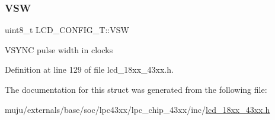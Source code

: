 \subsubsection{\texorpdfstring{V\+SW}{VSW}}
{\footnotesize\ttfamily uint8\+\_\+t L\+C\+D\+\_\+\+C\+O\+N\+F\+I\+G\+\_\+\+T\+::\+V\+SW}

V\+S\+Y\+NC pulse width in clocks 

Definition at line 129 of file lcd\+\_\+18xx\+\_\+43xx.\+h.



The documentation for this struct was generated from the following file\+:\begin{DoxyCompactItemize}
\item 
muju/externals/base/soc/lpc43xx/lpc\+\_\+chip\+\_\+43xx/inc/\hyperlink{lcd__18xx__43xx_8h}{lcd\+\_\+18xx\+\_\+43xx.\+h}\end{DoxyCompactItemize}
